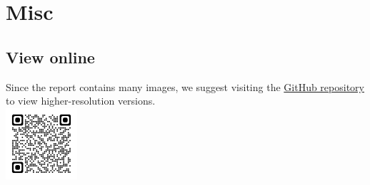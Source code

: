 \documentclass[12pt]{article}
\begin{document}




    \section{Misc}

    \subsection{View online}
    Since the report contains many images, we suggest visiting the \href{https://github.com/CSIEHaTerX/Dr.UML/}{GitHub repository} to view higher-resolution versions.\\
    \includegraphics[]{assets/repoQRCode}
    \\
\end{document}
